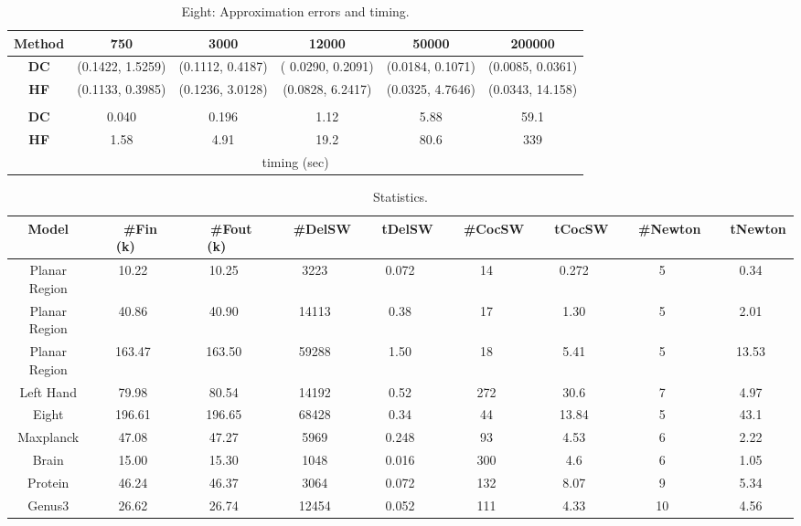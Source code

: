 \documentclass[11pt]{article}
\begin{document}
\begin{table}[!h]
\begin{center}
\begin{tabular}{| c | c | c | c | c |c|}
\hline
Method  & 750 &  3000 & 12000 & 50000 & 200000 \\
\hline
{\bf DC} & (0.1422, 1.5259) & (0.1112, 0.4187) & ( 0.0290, 0.2091) & (0.0184, 0.1071) & (0.0085, 0.0361)\\
\hline
{\bf HF} & (0.1133, 0.3985) & (0.1236, 3.0128) & (0.0828, 6.2417) & (0.0325, 4.7646) & (0.0343, 14.158)\\
\hline
\multicolumn{6}{|c|}{ } \\
\hline
{\bf DC} & 0.040 & 0.196 & 1.12 &5.88  & 59.1 \\
\hline
{\bf HF} & 1.58 & 4.91 & 19.2 & 80.6 & 339\\
\hline
\multicolumn{6}{|c|}{ timing (sec)} \\
\hline
\end{tabular}
\end{center}
\vspace{-0.1in}
\caption{Eight: Approximation errors and timing.
\label{tbl:eight}
}
\end{table}



\begin{table}[htbp]
\begin{center}
\begin{tabular}{| c | c | c | c | c | c|c|c|c|}
\hline
Model       & ~~\#Fin (k)~~ &  ~~\#Fout (k)~~ & ~~\#DelSW~~ & ~~tDelSW~~ &~~\#CocSW~~ & ~~tCocSW~~ & ~~\#Newton~~ & ~~tNewton~~   \\
\hline
{Planar Region} & 10.22	& 10.25   	  & 3223    & 0.072  & 14      & 0.272  & 5        & 0.34\\
\hline
{Planar Region} & 40.86	& 40.90   	  & 14113   & 0.38   & 17      & 1.30   & 5        & 2.01\\
\hline
{Planar Region} & 163.47	& 163.50   & 59288   & 1.50   & 18      & 5.41   & 5        & 13.53\\
\hline
{Left Hand} & 79.98	& 80.54   	  & 14192   & 0.52   & 272     & 30.6   & 7        & 4.97\\
\hline
{Eight} & 196.61	& 196.65   	  & 68428   & 0.34   & 44     & 13.84   & 5        & 43.1\\
\hline
{Maxplanck} & 47.08 		& 47.27   	  & 5969    & 0.248  & 93      & 4.53   & 6        & 2.22\\
\hline
{Brain} 	 	& 15.00	& 15.30   	  & 1048   & 0.016   & 300     & 4.6   & 6        & 1.05\\
\hline
{Protein} 	 	& 46.24	&  46.37  	  & 3064   & 0.072   & 132     & 8.07   & 9        & 5.34\\
\hline
{Genus3} 	 	& 26.62	&  26.74  	  & 12454   & 0.052   & 111     & 4.33   & 10        & 4.56\\
\hline
\end{tabular}
\end{center}
\caption{Statistics.
\label{tbl:statistics}
}
\end{table}
\end{document}
